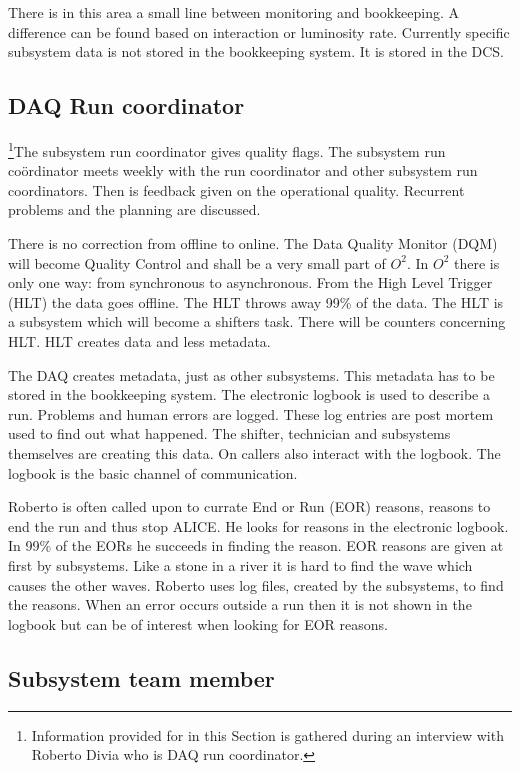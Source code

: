 There is in this area a small line between monitoring and bookkeeping. A difference can be found based on interaction or luminosity rate. Currently specific subsystem data is not stored in the bookkeeping system. It is stored in the DCS.

\subsection{DAQ Run coordinator}
\footnote{Information provided for in this Section is gathered during an interview with Roberto Divia who is DAQ run coordinator.}The subsystem run coordinator gives quality flags. The subsystem run co\"ordinator meets weekly with the run coordinator and other subsystem run coordinators. Then is feedback given on the operational quality. Recurrent problems and the planning are discussed.

There is no correction from offline to online. The Data Quality Monitor (DQM) will become Quality Control and shall be a very small part of $O^2$. In $O^2$ there is only one way: from synchronous to asynchronous. From the High Level Trigger (HLT) the data goes offline. The HLT throws away 99\% of the data. The HLT is a subsystem which will become a shifters task. There will be counters concerning HLT. HLT creates data and less metadata. 

The DAQ creates metadata, just as other subsystems. This metadata has to be stored in the bookkeeping system. The electronic logbook is used to describe a run. Problems and human errors are logged. These log entries are post mortem used to find out what happened. The shifter, technician and subsystems themselves are creating this data. On callers also interact with the logbook. The logbook is the basic channel of communication.


Roberto is often called upon to currate End or Run (EOR) reasons, reasons to end the run and thus stop ALICE. He looks for reasons in the electronic logbook. In 99\% of the EORs he succeeds in finding the reason. EOR reasons are given at first by subsystems. Like a stone in a river it is hard to find the wave which causes the other waves. Roberto uses log files, created by the subsystems, to find the reasons. When an error occurs outside a run then it is not shown in the logbook but can be of interest when looking for EOR reasons. 

\subsection{Subsystem team member}

